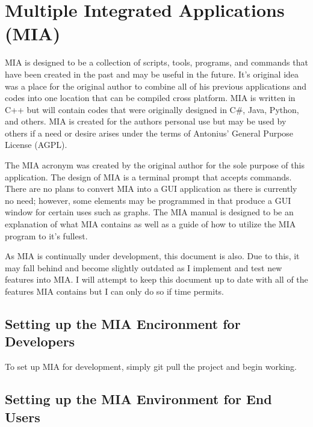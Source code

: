 \chapter{Multiple Integrated Applications (MIA)}
\pagestyle{fancy}

MIA is designed to be a collection of scripts, tools, programs, and commands that have been created in the past and may be useful in the future. It's original idea was a place for the original author to combine all of his previous applications and codes into one location that can be compiled cross platform. MIA is written in C++ but will contain codes that were originally designed in C\#, Java, Python, and others. MIA is created for the authors personal use but may be used by others if a need or desire arises under the terms of Antonius’ General Purpose License (AGPL). 

The MIA acronym was created by the original author for the sole purpose of this application. The design of MIA is a terminal prompt that accepts commands. There are no plans to convert MIA into a GUI application as there is currently no need; however, some elements may be programmed in that produce a GUI window for certain uses such as graphs. The MIA manual is designed to be an explanation of what MIA contains as well as a guide of how to utilize the MIA program to it's fullest. 

As MIA is continually under development, this document is also. Due to this, it may fall behind and become slightly outdated as I implement and test new features into MIA. I will attempt to keep this document up to date with all of the features MIA contains but I can only do so if time permits.

\section{Setting up the MIA Encironment for Developers}

To set up MIA for development, simply git pull the project and begin working.

\section{Setting up the MIA Environment for End Users}

